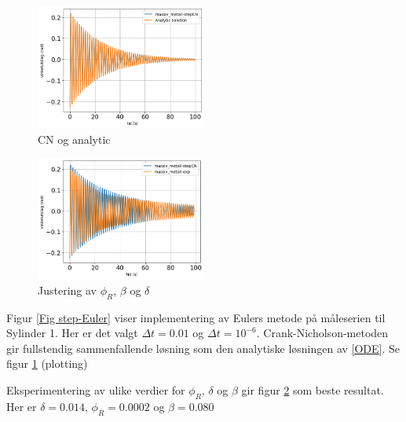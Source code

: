 \documentclass[5p]{elsarticle}
\begin{document}
\begin{figure}[] 
	\begin{center}
		\includegraphics[width=0.5\textwidth]{Plots/Saved-Plots/combined-analytic/massiv_metall-stepCN.png}
  
 \end{center}
	\caption{CN og analytic}
	\label{Fig CN} %
\end{figure}

\begin{figure}[] 
	\begin{center}
		\includegraphics[width=0.5\textwidth]{Plots/Saved-Plots/Tweaking/Massiv metall/massiv_metall-stepCN.png}
  
 \end{center}
	\caption{Justering av \(\phi_R\), \(\beta\) og \(\delta\)}
	\label{Fig tweaking} %
\end{figure}

Figur \ref{Fig step-Euler} viser implementering av Eulers metode på måleserien til Sylinder 1. Her er det valgt \(\Delta t = 0.01\) og \(\Delta t = 10^{-6}\). 
Crank-Nicholson-metoden gir fullstendig sammenfallende løsning som den analytiske løsningen av \eqref{ODE}. Se figur \ref{Fig CN}
(plotting)

Eksperimentering av ulike verdier for \(\phi_R\), \(\delta\) og \(\beta\) gir figur \ref{Fig tweaking} som beste resultat. Her er \(\delta = 0.014\), \(\phi_R = 0.0002\) og \(\beta = 0.080\)
\end{document}
